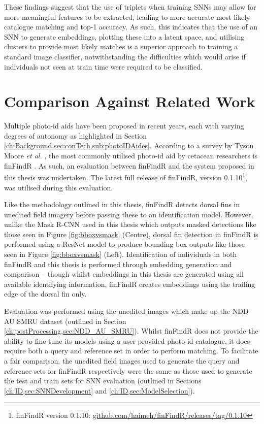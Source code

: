 These findings suggest that the use of triplets when training SNNs may allow for more meaningful features to be extracted, leading to more accurate most likely catalogue matching and top-1 accuracy. As such, this indicates that the use of an SNN to generate embeddings, plotting these into a latent space, and utilising clusters to provide most likely matches is a superior approach to training a standard image classifier, notwithstanding the difficulties which would arise if individuals not seen at train time were required to be classified.

\section{Comparison Against Related Work}\label{ch:SNNEvaluation,sec:FinFindRComparison}

Multiple photo-id aids have been proposed in recent years, each with varying degrees of autonomy as highlighted in Section \ref{ch:Background,sec:conTech,sub:photoIDAides}. According to a survey by Tyson Moore \textit{et al.} \cite{tyson_moore_rise_2022}, the most commonly utilised photo-id aid by cetacean researchers is finFindR \cite{thompson_finfindr_2022}. As such, an evaluation between finFindR and the system proposed in this thesis was undertaken. The latest full release of finFindR, version 0.1.10\footnote{\label{footnote:finFindR}finFindR version 0.1.10: \href{https://github.com/haimeh/finFindR/releases/tag/0.1.10}{github.com/haimeh/finFindR/releases/tag/0.1.10}}, was utilised during this evaluation. 

Like the methodology outlined in this thesis, finFindR detects dorsal fins in unedited field imagery before passing these to an identification model. However, unlike the Mask R-CNN used in this thesis which outputs masked detections like those seen in Figure \ref{fig:bboxvsmask} (Centre), dorsal fin detection in finFindR is performed using a ResNet \cite{he_deep_2015} model to produce bounding box outputs like those seen in Figure \ref{fig:bboxvsmask} (Left). Identification of individuals in both finFindR and this thesis is performed through embedding generation and comparison -- though whilst embeddings in this thesis are generated using all available identifying information, finFindR creates embeddings using the trailing edge of the dorsal fin only.

Evaluation was performed using the unedited images which make up the NDD AU SMRU dataset (outlined in Section \ref{ch:postProcessing,sec:NDD_AU_SMRU}). Whilst finFindR does not provide the ability to fine-tune its models using a user-provided photo-id catalogue, it does require both a query and reference set in order to perform matching. To facilitate a fair comparison, the unedited field images used to generate the query and reference sets for finFindR respectively were the same as those used to generate the test and train sets for SNN evaluation (outlined in Sections \ref{ch:ID,sec:SNNDevelopment} and \ref{ch:ID,sec:ModelSelection}). 

